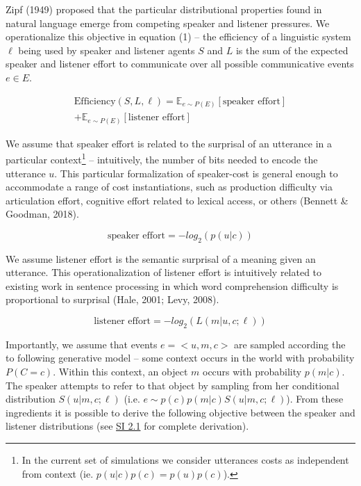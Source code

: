 \documentclass[10pt, letterpaper]{article}
\begin{document}
Zipf (1949) proposed that the particular distributional properties found
in natural language emerge from competing speaker and listener
pressures. We operationalize this objective in equation (1) -- the
efficiency of a linguistic system \(\ell\) being used by speaker and
listener agents \(S\) and \(L\) is the sum of the expected speaker and
listener effort to communicate over all possible communicative events
\(e \in E\).\par

\begin{equation}
\begin{split}
  \text{Efficiency}(S, L, \ell) = \mathbb{E}_{e \sim P(E)}[\text{speaker effort}] \\+ \mathbb{E}_{e \sim P(E)}[\text{listener effort}]
\end{split}
\end{equation}

We assume that speaker effort is related to the surprisal of an
utterance in a particular
context\footnote{In the current set of simulations we consider utterances costs as independent from context (ie. $p(u|c)p(c)=p(u)p(c)$).}
-- intuitively, the number of bits needed to encode the utterance \(u\).
This particular formalization of speaker-cost is general enough to
accommodate a range of cost instantiations, such as production
difficulty via articulation effort, cognitive effort related to lexical
access, or others (Bennett \& Goodman, 2018).\par

\[\text{speaker effort} = -log_2(p(u|c))\]

We assume listener effort is the semantic surprisal of a meaning given
an utterance. This operationalization of listener effort is intuitively
related to existing work in sentence processing in which word
comprehension difficulty is proportional to surprisal (Hale, 2001; Levy,
2008).

\[\text{listener effort} = -log_2(L(m|u, c; \ell))\]

Importantly, we assume that events \(e = <u, m, c>\) are sampled
according the to following generative model -- some context occurs in
the world with probability \(P(C=c)\). Within this context, an object
\(m\) occurs with probability \(p(m|c)\). The speaker attempts to refer
to that object by sampling from her conditional distribution
\(S(u|m, c; \ell)\) (i.e. \(e \sim p(c)p(m|c)S(u|m, c; \ell)\)). From
these ingredients it is possible to derive the following objective
between the speaker and listener distributions (see
\href{https://github.com/benpeloquin7/zipf_principles/blob/master/paper/supplementary_materials.pdf}{SI 2.1}
for complete derivation).
\end{document}
